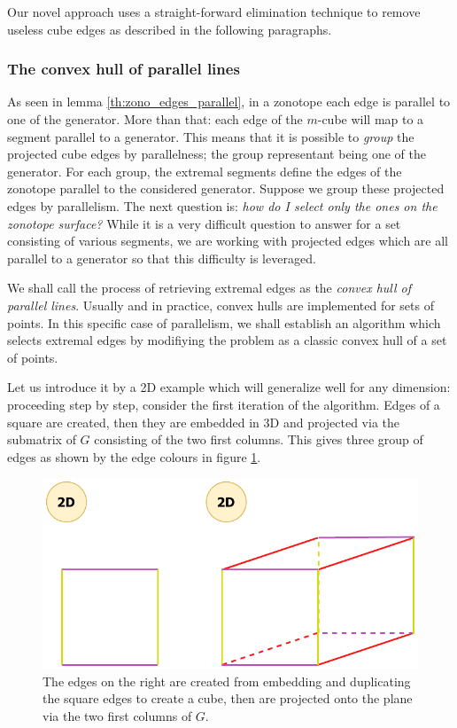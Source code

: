 Our novel approach uses a straight-forward elimination technique to remove useless cube edges as described in the following paragraphs.


\subsubsection*{The convex hull of parallel lines}
As seen in lemma \ref{th:zono_edges_parallel}, in a zonotope each edge is parallel to one of the generator. More than that: each edge of the $m$-cube will map to a segment parallel to a generator. This means that it is possible to \emph{group} the projected cube edges by parallelness; the group representant being one of the generator. For each group, the extremal segments define the edges of the zonotope parallel to the considered generator.
Suppose we group these projected edges by parallelism. The next question is: \emph{how do I select only the ones on the zonotope surface?} While it is a very difficult question to answer for a set consisting of various segments, we are working with projected edges which are all parallel to a generator so that this difficulty is leveraged. 

We shall call the process of retrieving extremal edges as the \emph{convex hull of parallel lines}. Usually and in practice, convex hulls are implemented for sets of points. In this specific case of parallelism, we shall establish an algorithm which selects extremal edges by modifiying the problem as a classic convex hull of a set of points.

Let us introduce it by a 2D example which will generalize well for any dimension: proceeding step by step, consider the first iteration of the algorithm. Edges of a square are created, then they are embedded in 3D and projected via the submatrix of $G$ consisting of the two first columns. This gives three group of edges as shown by the edge colours in figure \ref{fig:convex_hull_lines_intro}.
\begin{figure}[!htb]
    \captionsetup{justification=centering}
    
    \centering
    \includegraphics[trim={0 0 0 0},clip,width=0.5\linewidth]{img/chapter_2/zonotope_convex_hull_lines_intro.pdf}

    \caption{The edges on the right are created from embedding and duplicating the square edges to create a cube, then are projected onto the plane via the two first columns of $G$.}
    \label{fig:convex_hull_lines_intro}
\end{figure}

